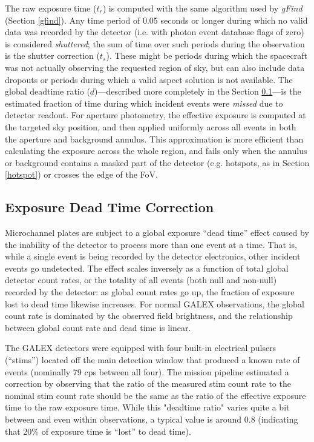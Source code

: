 \documentclass[preprint]{aastex}
\begin{document}
The raw exposure time ($t_r$) is computed with the same algorithm used by \emph{gFind} (Section \ref{gfind}). Any time period of 0.05 seconds or longer during which no valid data was recorded by the detector (i.e. with photon event database flags of zero) is considered \emph{shuttered}; the sum of time over such periods during the observation is the shutter correction ($t_s$). These might be periods during which the spacecraft was not actually observing the requested region of sky, but can also include data dropouts or periods during which a valid aspect solution is not available. The global deadtime ratio ($d$)---described more completely in the Section \ref{deadtimedesc}---is the estimated fraction of time during which incident events were \emph{missed} due to detector readout. For aperture photometry, the effective exposure is computed at the targeted sky position, and then applied uniformly across all events in both the aperture and background annulus. This approximation is more efficient than calculating the exposure across the whole region, and fails only when the annulus or background contains a masked part of the detector (e.g. hotspots, as in Section \ref{hotspot}) or crosses the edge of the FoV.

\subsection{Exposure Dead Time Correction}
\label{deadtimedesc}
Microchannel plates are subject to a global exposure ``dead time'' effect caused by the inability of the detector to process more than one event at a time. That is, while a single event is being recorded by the detector electronics, other incident events go undetected. The effect scales inversely as a function of total global detector count rates, or the totality of all events (both null and non-null) recorded by the detector: as global count rates go up, the fraction of exposure lost to dead time likewise increases. For normal GALEX observations, the global count rate is dominated by the observed field brightness, and the relationship between global count rate and dead time is linear.

The GALEX detectors were equipped with four built-in electrical pulsers (``stims'') located off the main detection window that produced a known rate of events (nominally 79 cps between all four). The mission pipeline estimated a correction by observing that the ratio of the measured stim count rate to the nominal stim count rate should be the same as the ratio of the effective exposure time to the raw exposure time. While this "deadtime ratio" varies quite a bit between and even within observations, a typical value is around 0.8 (indicating that 20\% of exposure time is ``lost'' to dead time).
\end{document}
